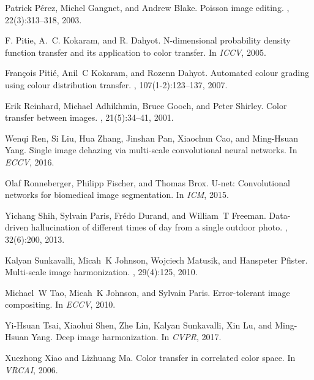 \documentclass[10pt,twocolumn,letterpaper]{article}
\begin{document}
\begin{thebibliography}{10}
Patrick P{\'e}rez, Michel Gangnet, and Andrew Blake.
\newblock Poisson image editing.
, 22(3):313--318, 2003.

F. {Pitie}, A.~C. {Kokaram}, and R. {Dahyot}.
\newblock N-dimensional probability density function transfer and its
  application to color transfer.
\newblock In {\em ICCV}, 2005.

Fran{\c{c}}ois Piti{\'e}, Anil~C Kokaram, and Rozenn Dahyot.
\newblock Automated colour grading using colour distribution transfer.
, 107(1-2):123--137,
  2007.

Erik Reinhard, Michael Adhikhmin, Bruce Gooch, and Peter Shirley.
\newblock Color transfer between images.
, 21(5):34--41, 2001.

Wenqi Ren, Si Liu, Hua Zhang, Jinshan Pan, Xiaochun Cao, and Ming-Hsuan Yang.
\newblock Single image dehazing via multi-scale convolutional neural networks.
\newblock In {\em ECCV}, 2016.

Olaf Ronneberger, Philipp Fischer, and Thomas Brox.
\newblock U-net: Convolutional networks for biomedical image segmentation.
\newblock In {\em ICM}, 2015.

Yichang Shih, Sylvain Paris, Fr{\'e}do Durand, and William~T Freeman.
\newblock Data-driven hallucination of different times of day from a single
  outdoor photo.
, 32(6):200, 2013.

Kalyan Sunkavalli, Micah~K Johnson, Wojciech Matusik, and Hanspeter Pfister.
\newblock Multi-scale image harmonization.
, 29(4):125, 2010.

Michael~W Tao, Micah~K Johnson, and Sylvain Paris.
\newblock Error-tolerant image compositing.
\newblock In {\em ECCV}, 2010.

Yi-Hsuan Tsai, Xiaohui Shen, Zhe Lin, Kalyan Sunkavalli, Xin Lu, and Ming-Hsuan
  Yang.
\newblock Deep image harmonization.
\newblock In {\em CVPR}, 2017.

Xuezhong Xiao and Lizhuang Ma.
\newblock Color transfer in correlated color space.
\newblock In {\em VRCAI}, 2006.


\end{thebibliography}
\end{document}
